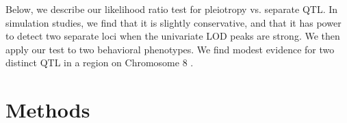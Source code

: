 \documentclass[12pt,twoside, lineno]{gsajnl}
\begin{document}
Below, we describe our likelihood ratio test for pleiotropy vs. separate QTL. In simulation studies, we find that it is slightly conservative, and that it has power to detect two separate loci when the univariate LOD peaks are strong. We then apply our test to two behavioral phenotypes. We find modest evidence for two distinct QTL in a region on Chromosome 8 \citep{logan2013high,recla2014precise}. 






\section{Methods}
\label{sec:materials:methods}

\end{document}
